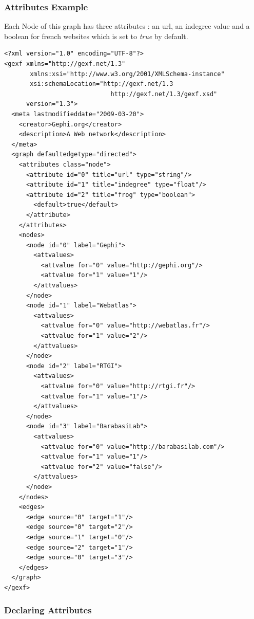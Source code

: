 \documentclass[a4paper,10pt]{article}
\begin{document}
\subsubsection{Attributes Example}

Each Node of this graph has three attributes : an url, an indegree value and a boolean for french websites which is set to \textit{true} by default.

\lstset{ style=gexf }
\begin{lstlisting}[caption={A (small) Web Graph},label=webgraph]
<?xml version="1.0" encoding="UTF-8"?>
<gexf xmlns="http://gexf.net/1.3"
       xmlns:xsi="http://www.w3.org/2001/XMLSchema-instance"
       xsi:schemaLocation="http://gexf.net/1.3
                             http://gexf.net/1.3/gexf.xsd"
      version="1.3">
  <meta lastmodifieddate="2009-03-20">
    <creator>Gephi.org</creator>
    <description>A Web network</description>
  </meta>
  <graph defaultedgetype="directed">
    <attributes class="node">
      <attribute id="0" title="url" type="string"/>
      <attribute id="1" title="indegree" type="float"/>
      <attribute id="2" title="frog" type="boolean">
        <default>true</default>
      </attribute>
    </attributes>
    <nodes>
      <node id="0" label="Gephi">
        <attvalues>
          <attvalue for="0" value="http://gephi.org"/>
          <attvalue for="1" value="1"/>
        </attvalues>
      </node>
      <node id="1" label="Webatlas">
        <attvalues>
          <attvalue for="0" value="http://webatlas.fr"/>
          <attvalue for="1" value="2"/>
        </attvalues>
      </node>
      <node id="2" label="RTGI">
        <attvalues>
          <attvalue for="0" value="http://rtgi.fr"/>
          <attvalue for="1" value="1"/>
        </attvalues>
      </node>
      <node id="3" label="BarabasiLab">
        <attvalues>
          <attvalue for="0" value="http://barabasilab.com"/>
          <attvalue for="1" value="1"/>
          <attvalue for="2" value="false"/>
        </attvalues>
      </node>
    </nodes>
    <edges>
      <edge source="0" target="1"/>
      <edge source="0" target="2"/>
      <edge source="1" target="0"/>
      <edge source="2" target="1"/>
      <edge source="0" target="3"/>
    </edges>
  </graph>
</gexf>
\end{lstlisting}


\subsubsection{Declaring Attributes}
\end{document}
